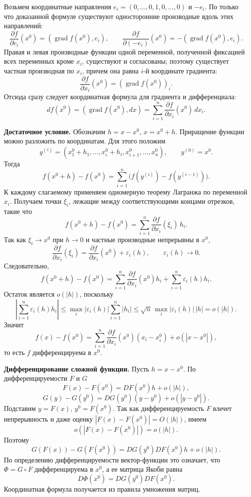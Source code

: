\documentclass[12pt,a4paper]{article}
\newcommand{\eps}{\varepsilon}
\newcommand{\grad}{\operatorname{grad}}
\newcommand{\Jac}{D}
\begin{document}
Возьмем координатные направления \(e_i=(0,\dots,0,1,0,\dots,0)\) и
\(-e_i\). По только что доказанной формуле существуют односторонние
производные вдоль этих направлений:
\[
  \frac{\partial f}{\partial e_i}(x^0)=(\grad f(x^0),e_i),
  \qquad
  \frac{\partial f}{\partial (-e_i)}(x^0)=-(\grad f(x^0),e_i).
\]
Правая и левая производные функции одной переменной, полученной фиксацией всех
переменных кроме \(x_i\), существуют и согласованы; поэтому существует частная
производная по \(x_i\), причем она равна \(i\)-й координате градиента:
\[
  \frac{\partial f}{\partial x_i}(x^0)=(\grad f(x^0))_i.
\]
Отсюда сразу следует координатная формула для градиента и дифференциала:
\[
  df(x^0)=(\grad f(x^0),dx)
  =
  \sum_{i=1}^n
  \frac{\partial f}{\partial x_i}(x^0)\,dx_i.
\]

\textbf{Достаточное условие.}
Обозначим \(h=x-x^0\), \(x=x^0+h\). Приращение функции можно разложить по
координатам. Для этого положим
\[
  y^{(i)}=(x^0_1+h_1,\dots,x^0_i+h_i,x^0_{i+1},\dots,x^0_n),
  \qquad y^{(0)}=x^0.
\]
Тогда
\[
  f(x^0+h)-f(x^0)
  =
  \sum_{i=1}^n \bigl(f(y^{(i)})-f(y^{(i-1)})\bigr).
\]
К каждому слагаемому применяем одномерную теорему Лагранжа по переменной
\(x_i\). Получаем точки \(\xi_i\), лежащие между соответствующими концами
отрезков, такие что
\[
  f(x^0+h)-f(x^0)
  =
  \sum_{i=1}^n
  \frac{\partial f}{\partial x_i}(\xi_i)\,h_i.
\]
Так как \(\xi_i\to x^0\) при \(h\to0\) и частные производные непрерывны в
\(x^0\),
\[
  \frac{\partial f}{\partial x_i}(\xi_i)
  =
  \frac{\partial f}{\partial x_i}(x^0)+\eps_i(h),
  \qquad \eps_i(h)\to0.
\]
Следовательно,
\[
  f(x^0+h)-f(x^0)
  =
  \sum_{i=1}^n
  \frac{\partial f}{\partial x_i}(x^0)h_i
  +
  \sum_{i=1}^n \eps_i(h)h_i.
\]
Остаток является \(o(|h|)\), поскольку
\[
  \left|\sum_{i=1}^n\eps_i(h)h_i\right|
  \le
  \max_i|\eps_i(h)|\sum_{i=1}^n |h_i|
  \le
  \sqrt n\,\max_i|\eps_i(h)|\,|h|
  =
  o(|h|).
\]
Значит
\[
  f(x)-f(x^0)=
  \sum_{i=1}^n
  \frac{\partial f}{\partial x_i}(x^0)(x_i-x_i^0)
  +
  o(|x-x^0|),
\]
то есть \(f\) дифференцируема в \(x^0\).

\textbf{Дифференцирование сложной функции.}
Пусть \(h=x-x^0\). По дифференцируемости \(F\) и \(G\)
\[
  F(x)-F(x^0)=\Jac F(x^0)h+o(|h|),
\]
\[
  G(y)-G(y^0)=\Jac G(y^0)(y-y^0)+o(|y-y^0|).
\]
Подставим \(y=F(x)\), \(y^0=F(x^0)\). Так как дифференцируемость \(F\)
влечет непрерывность и даже оценку \(|F(x)-F(x^0)|=O(|h|)\), имеем
\[
  o(|F(x)-F(x^0)|)=o(|h|).
\]
Поэтому
\[
  G(F(x))-G(F(x^0))
  =
  \Jac G(y^0)\Jac F(x^0)h+o(|h|).
\]
По определению дифференцируемости вектор-функции это означает, что
\(\Phi=G\circ F\) дифференцируема в \(x^0\), а ее матрица Якоби равна
\[
  \Jac\Phi(x^0)=\Jac G(y^0)\Jac F(x^0).
\]
Координатная формула получается из правила умножения матриц.
\end{document}
